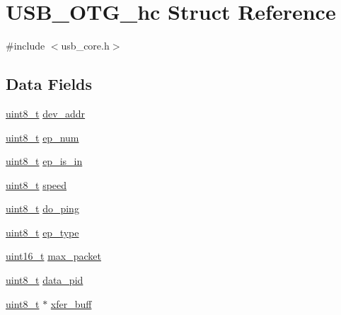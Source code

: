 \hypertarget{struct_u_s_b___o_t_g__hc}{\section{U\-S\-B\-\_\-\-O\-T\-G\-\_\-hc Struct Reference}
\label{struct_u_s_b___o_t_g__hc}
}


{\ttfamily \#include $<$usb\-\_\-core.\-h$>$}

\subsection*{Data Fields}
\begin{DoxyCompactItemize}
\item 
\hyperlink{stdint_8h_aba7bc1797add20fe3efdf37ced1182c5}{uint8\-\_\-t} \hyperlink{struct_u_s_b___o_t_g__hc_ab192566d22b5b4eea4347fa5a0db3c89}{dev\-\_\-addr}
\item 
\hyperlink{stdint_8h_aba7bc1797add20fe3efdf37ced1182c5}{uint8\-\_\-t} \hyperlink{struct_u_s_b___o_t_g__hc_add7d3bb441522a25b7f1f30329166991}{ep\-\_\-num}
\item 
\hyperlink{stdint_8h_aba7bc1797add20fe3efdf37ced1182c5}{uint8\-\_\-t} \hyperlink{struct_u_s_b___o_t_g__hc_abb0b4bdda4af97072940e872ac6b5aec}{ep\-\_\-is\-\_\-in}
\item 
\hyperlink{stdint_8h_aba7bc1797add20fe3efdf37ced1182c5}{uint8\-\_\-t} \hyperlink{struct_u_s_b___o_t_g__hc_ae645398ec19a1becfafd72797d54c07f}{speed}
\item 
\hyperlink{stdint_8h_aba7bc1797add20fe3efdf37ced1182c5}{uint8\-\_\-t} \hyperlink{struct_u_s_b___o_t_g__hc_ad404179e19cea6269c20dd36e1104ea2}{do\-\_\-ping}
\item 
\hyperlink{stdint_8h_aba7bc1797add20fe3efdf37ced1182c5}{uint8\-\_\-t} \hyperlink{struct_u_s_b___o_t_g__hc_a66a16a1ca10dff9b47cde3a65fa638e9}{ep\-\_\-type}
\item 
\hyperlink{stdint_8h_a273cf69d639a59973b6019625df33e30}{uint16\-\_\-t} \hyperlink{struct_u_s_b___o_t_g__hc_a685591cbf9208cc10a5b576a33655770}{max\-\_\-packet}
\item 
\hyperlink{stdint_8h_aba7bc1797add20fe3efdf37ced1182c5}{uint8\-\_\-t} \hyperlink{struct_u_s_b___o_t_g__hc_a64fbfbe0cf9526d30649604ad9268726}{data\-\_\-pid}
\item 
\hyperlink{stdint_8h_aba7bc1797add20fe3efdf37ced1182c5}{uint8\-\_\-t} $\ast$ \hyperlink{struct_u_s_b___o_t_g__hc_a4638dd381bbefa48eadbb3de730e7a79}{xfer\-\_\-buff}
\item 

\end{DoxyCompactItemize}
